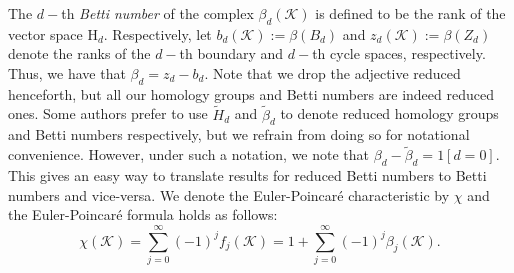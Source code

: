 \documentclass[12pt]{amsart}
\numberwithin{equation}{section}
\numberwithin{theorem}{section}
\newcommand{\Hg}{\mathrm{H}}
\newcommand{\1}{\mathbf{1}}
\def\K{\mathcal{K}}
\begin{document}
The $d-$th {\em Betti number} of the complex $\beta_d(\K)$ is defined to be the rank of the vector space $\Hg_d$. Respectively, let $b_d(\K) := \beta(B_d)$ and $z_d(\K) :=  \beta(Z_d)$ denote the ranks of the $d-$th boundary and $d-$th cycle spaces, respectively. Thus, we have that $\beta_d = z_d - b_d.$ Note that we drop the adjective reduced henceforth, but all our homology groups and Betti numbers are indeed reduced ones. Some authors prefer to use $\tilde{H}_d$ and $\tilde{\beta}_d$ to denote reduced homology groups and Betti numbers respectively, but we refrain from doing so for notational convenience. However, under such a notation, we note that $\beta_d - \tilde{\beta}_d = 1[d = 0]$. This gives an easy way to translate results for reduced Betti numbers to Betti numbers and vice-versa. We denote the Euler-Poincar\'{e} characteristic by $\chi$ and the Euler-Poincar\'{e} formula holds as follows:
%
\begin{equation}
\label{eqn:EP_formula}
\chi(\K) = \sum_{j=0}^{\infty}(-1)^j f_j(\K) = 1 + \sum_{j=0}^{\infty}(-1)^j \beta_j(\K).
\end{equation}
%
\end{document}
